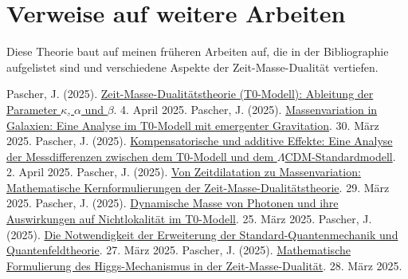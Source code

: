 \documentclass[a4paper,12pt]{article}
\begin{document}
	\section{Verweise auf weitere Arbeiten}
	
	Diese Theorie baut auf meinen früheren Arbeiten auf, die in der Bibliographie aufgelistet sind und verschiedene Aspekte der Zeit-Masse-Dualität vertiefen.
	
	\begin{thebibliography}{99}
		 Pascher, J. (2025). \href{https://github.com/jpascher/T0-Time-Mass-Duality/tree/main/2/pdf/Deutsch/ZeitMasseT0Params.pdf}{Zeit-Masse-Dualitätstheorie (T0-Modell): Ableitung der Parameter \(\kappa\), \(\alpha\) und \(\beta\)}. 4. April 2025.
		 Pascher, J. (2025). \href{https://github.com/jpascher/T0-Time-Mass-Duality/tree/main/2/pdf/Deutsch/MassVarGalaxien.pdf}{Massenvariation in Galaxien: Eine Analyse im T0-Modell mit emergenter Gravitation}. 30. März 2025.
		 Pascher, J. (2025). \href{https://github.com/jpascher/T0-Time-Mass-Duality/tree/main/2/pdf/Deutsch/MessdifferenzenT0Standard.pdf}{Kompensatorische und additive Effekte: Eine Analyse der Messdifferenzen zwischen dem T0-Modell und dem \(\Lambda\)CDM-Standardmodell}. 2. April 2025.
		 Pascher, J. (2025). \href{https://github.com/jpascher/T0-Time-Mass-Duality/tree/main/2/pdf/Deutsch/MathZeitMasseLagrange.pdf}{Von Zeitdilatation zu Massenvariation: Mathematische Kernformulierungen der Zeit-Masse-Dualitätstheorie}. 29. März 2025.
		 Pascher, J. (2025). \href{https://github.com/jpascher/T0-Time-Mass-Duality/tree/main/2/pdf/Deutsch/DynMassePhotonenNichtlokal.pdf}{Dynamische Masse von Photonen und ihre Auswirkungen auf Nichtlokalität im T0-Modell}. 25. März 2025.
		 Pascher, J. (2025). \href{https://github.com/jpascher/T0-Time-Mass-Duality/tree/main/2/pdf/Deutsch/NotwendigkeitQMErweiterung.pdf}{Die Notwendigkeit der Erweiterung der Standard-Quantenmechanik und Quantenfeldtheorie}. 27. März 2025.
		 Pascher, J. (2025). \href{https://github.com/jpascher/T0-Time-Mass-Duality/tree/main/2/pdf/Deutsch/MathHiggsZeitMasse.pdf}{Mathematische Formulierung des Higgs-Mechanismus in der Zeit-Masse-Dualität}. 28. März 2025.
	\end{thebibliography}
	
\end{document}
